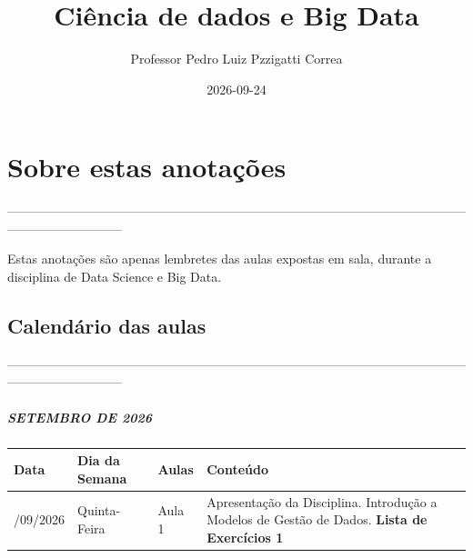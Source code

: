\documentclass[
]{book}
\title{Ciência de dados e Big Data}
\author{Professor Pedro Luiz Pzzigatti Correa}
\date{2026-09-24}
\begin{document}
\maketitle

{
\setcounter{tocdepth}{1}
\tableofcontents
}
\chapter*{Sobre estas anotações}\label{sobre-estas-anotauxe7uxf5es}

---------------------------------------------------------------------------------------------------------------------------------------

Estas anotações são apenas lembretes das aulas expostas em sala, durante a disciplina de Data Science e Big Data.

\section*{Calendário das aulas}\label{calenduxe1rio-das-aulas}

---------------------------------------------------------------------------------------------------------------------------------------

\paragraph*{SETEMBRO DE 2026}\label{setembro-de-2026}

\begin{longtable}[]{@{}
  >{\raggedright\arraybackslash}p{}
  >{\raggedright\arraybackslash}p{}
  >{\raggedright\arraybackslash}p{}
  >{\raggedright\arraybackslash}p{}@{}}
\toprule\noalign{}
\begin{minipage}[b]{\linewidth}\raggedright
Data
\end{minipage} & \begin{minipage}[b]{\linewidth}\raggedright
Dia da Semana
\end{minipage} & \begin{minipage}[b]{\linewidth}\raggedright
Aulas
\end{minipage} & \begin{minipage}[b]{\linewidth}\raggedright
Conteúdo
\end{minipage} \\
\midrule\noalign{}
\endhead
\bottomrule\noalign{}
\endlastfoot
24/09/2026 & Quinta-Feira & Aula 1 & Apresentação da Disciplina. Introdução a Modelos de Gestão de Dados. \textbf{Lista de Exercícios 1} \\
\end{longtable}
\end{document}
